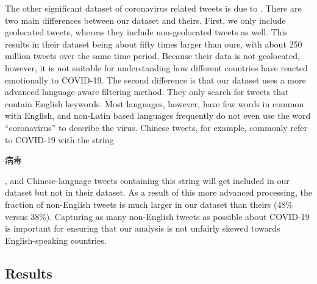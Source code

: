 \documentclass[11pt]{article}
\newcommand{\bertmoji}{\texttt{BERTmoticon}}
\DeclareMathOperator{\emoticon}{\texttt{TwitterEmoticon}}
\DeclareMathOperator{\corona}{\texttt{TwitterCOVID}}
\begin{document}
The other significant dataset of coronavirus related tweets is due to \citet{chen2020tracking}.
There are two main differences between our dataset and theirs.
First, we only include geolocated tweets,
whereas they include non-geolocated tweets as well.
This results in their dataset being about fifty times larger than ours,
with about 250 million tweets over the same time period.
Because their data is not geolocated, however, it is not suitable for understanding how different countries have reacted emotionally to COVID-19.
The second difference is that our dataset uses a more advanced language-aware filtering method.
They only search for tweets that contain English keywords.
Most languages, however, have few words in common with English,
and non-Latin based languages frequently do not even use the word ``coronavirus'' to describe the virus.
Chinese tweets, for example, commonly refer to COVID-19 with the string
\begin{CJK}{UTF8}{gbsn}
病毒
\end{CJK},
and Chinese-language tweets containing this string will get included in our dataset but not in their dataset.
As a result of this more advanced processing, the fraction of non-English tweets is much larger in our dataset than theirs (48\% versus 38\%).
Capturing as many non-English tweets as possible about COVID-19 is important for ensuring that our analysis is not unfairly skewed towards English-speaking countries.



\subsection{Results}
\end{document}
